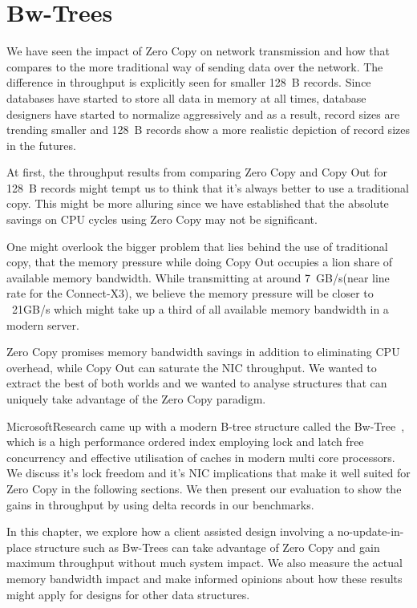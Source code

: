 
\chapter{Bw-Trees}
\label{chap:bw-tree}

We have seen the impact of Zero Copy on network transmission and how that 
compares to the more traditional way of sending data over the network. The difference
in throughput is explicitly seen for smaller 128~B records. Since databases have started
to store all data in memory at all times, database designers have started to normalize 
aggressively and as a result, record sizes are trending smaller and 128~B records show
a more realistic depiction of record sizes in the futures.

At first, the throughput results from comparing Zero Copy and Copy Out for 128~B 
records might tempt  us to think that
it's always better to use a traditional copy. This might be more alluring since we 
 have established that the absolute savings on CPU cycles using Zero Copy may not be 
 significant. 

 One might overlook the bigger problem that lies behind the use of traditional
 copy, that the memory pressure while doing Copy Out occupies a lion share of available
 memory bandwidth. While transmitting at around 7~GB/s(near line rate for the Connect-X3\textregistered),
  we believe the memory pressure will be closer to ~21GB/s which might take up a third of
  all available memory bandwidth in a modern server.

Zero Copy promises memory bandwidth savings in addition to eliminating CPU overhead, 
while Copy Out can saturate the NIC throughput. We wanted to extract the best of both worlds 
and we wanted to analyse structures that can uniquely take advantage of the 
Zero Copy paradigm. 

Microsoft\textregistered Research came up with a modern B-tree structure called 
the Bw-Tree~\cite{bw-tree}, which is a high performance ordered index employing
 lock and latch free concurrency and effective utilisation of caches in 
 modern multi core processors. We discuss it's lock freedom and it's NIC implications
 that make it well suited for Zero Copy in the following sections. We then present
 our evaluation to show the gains in throughput by using delta records in our benchmarks. 

In this chapter, we explore how a client assisted design involving a no-update-in-place 
structure such as Bw-Trees can take advantage of Zero Copy and gain maximum throughput 
without much system impact. We also measure the actual memory bandwidth impact and 
make informed opinions about how these results might apply for designs for other data structures.

